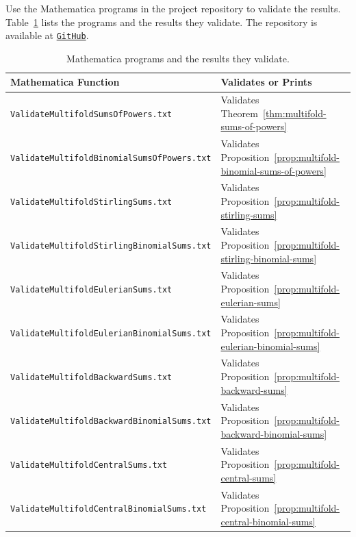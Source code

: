 Use the Mathematica programs in the project repository to validate the results. Table~\ref{tab:mathematica-programs} lists the programs and the results they validate. The repository is available at \href{https://github.com/kolosovpetro/NewtonsInterpolationFormulaAndSumsOfPowers/tree/main/mathematica}{\texttt{GitHub}}.
\begin{table}[H]
  \centering
  \renewcommand{\arraystretch}{1.3}
  \begin{tabular}{ll}
    \toprule
    Mathematica Function  & Validates or Prints \\
    \midrule
    \texttt{ValidateMultifoldSumsOfPowers.txt}
    & Validates Theorem~\eqref{thm:multifold-sums-of-powers}
    \\
    \texttt{ValidateMultifoldBinomialSumsOfPowers.txt}
    & Validates Proposition~\eqref{prop:multifold-binomial-sums-of-powers}
    \\
    \texttt{ValidateMultifoldStirlingSums.txt}
    & Validates Proposition~\eqref{prop:multifold-stirling-sums}
    \\
    \texttt{ValidateMultifoldStirlingBinomialSums.txt}
    & Validates Proposition~\eqref{prop:multifold-stirling-binomial-sums}
    \\
    \texttt{ValidateMultifoldEulerianSums.txt}
    & Validates Proposition~\eqref{prop:multifold-eulerian-sums}
    \\
    \texttt{ValidateMultifoldEulerianBinomialSums.txt}
    & Validates Proposition~\eqref{prop:multifold-eulerian-binomial-sums}
    \\
    \texttt{ValidateMultifoldBackwardSums.txt}
    & Validates Proposition~\eqref{prop:multifold-backward-sums}
    \\
    \texttt{ValidateMultifoldBackwardBinomialSums.txt}
    & Validates Proposition~\eqref{prop:multifold-backward-binomial-sums}
    \\
    \texttt{ValidateMultifoldCentralSums.txt}
    & Validates Proposition~\eqref{prop:multifold-central-sums}
    \\
    \texttt{ValidateMultifoldCentralBinomialSums.txt}
    & Validates Proposition~\eqref{prop:multifold-central-binomial-sums}
    \\
    \bottomrule
  \end{tabular}
  \caption{Mathematica programs and the results they validate.}
  \label{tab:mathematica-programs}
\end{table}
